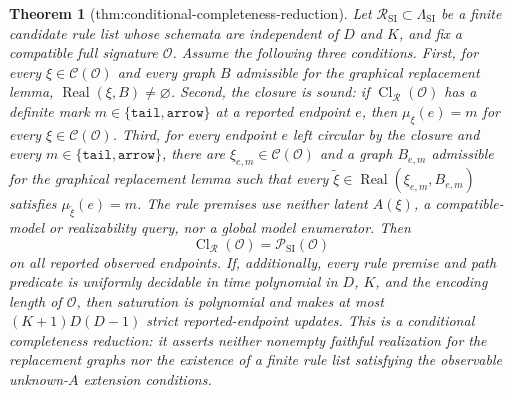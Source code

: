 \documentclass{article}
\newtheorem{theorem}{Theorem}
\begin{document}
\begin{theorem}[thm:conditional-completeness-reduction]\label{thm:conditional-completeness-reduction}
Let \(\mathcal R_{\mathrm{SI}}\subset\Lambda_{\mathrm{SI}}\) be a finite candidate rule list whose schemata are independent of \(D\) and \(K\), and fix a compatible full signature \(\mathcal O\). Assume the following three conditions. First, for every \(\xi\in\mathcal C(\mathcal O)\) and every graph \(B\) admissible for the graphical replacement lemma, \(\operatorname{Real}(\xi,B)\ne\varnothing\). Second, the closure is sound: if \(\operatorname{Cl}_{\mathcal R}(\mathcal O)\) has a definite mark \(m\in\{\mathtt{tail},\mathtt{arrow}\}\) at a reported endpoint \(e\), then \(\mu_\xi(e)=m\) for every \(\xi\in\mathcal C(\mathcal O)\). Third, for every endpoint \(e\) left circular by the closure and every \(m\in\{\mathtt{tail},\mathtt{arrow}\}\), there are \(\xi_{e,m}\in\mathcal C(\mathcal O)\) and a graph \(B_{e,m}\) admissible for the graphical replacement lemma such that every \(\widetilde\xi\in\operatorname{Real}(\xi_{e,m},B_{e,m})\) satisfies \(\mu_{\widetilde\xi}(e)=m\). The rule premises use neither latent \(A(\xi)\), a compatible-model or realizability query, nor a global model enumerator. Then
\[
 \operatorname{Cl}_{\mathcal R}(\mathcal O)
 =\mathcal P_{\mathrm{SI}}(\mathcal O)
\]
on all reported observed endpoints. If, additionally, every rule premise and path predicate is uniformly decidable in time polynomial in \(D\), \(K\), and the encoding length of \(\mathcal O\), then saturation is polynomial and makes at most \((K+1)D(D-1)\) strict reported-endpoint updates. This is a conditional completeness reduction: it asserts neither nonempty faithful realization for the replacement graphs nor the existence of a finite rule list satisfying the observable unknown-\(A\) extension conditions.
\end{theorem}
\end{document}
